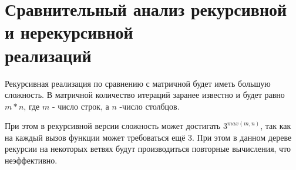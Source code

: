 \FloatBarrier

\section{Сравнительный анализ рекурсивной и нерекурсивной\\ реализаций}

Рекурсивная реализация по сравнению с матричной будет иметь большую сложность.
В матричной количество итераций заранее известно и будет равно
$m * n$, где $m$ - число строк, а $n$ -число столбцов.

При этом в рекурсивной версии сложность может достигать $3^{max(m, n)}$, так как
на каждый вызов функции может требоваться ещё 3. При этом в данном дереве рекурсии
на некоторых ветвях будут производиться повторные вычисления, что неэффективно.
